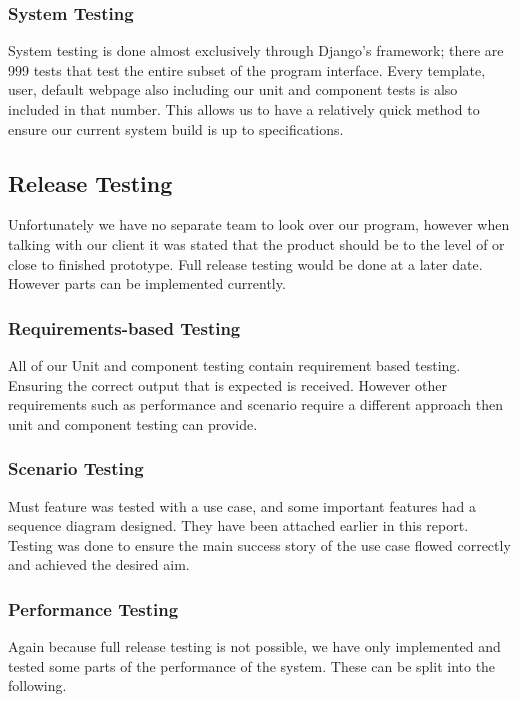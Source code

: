 \documentclass[11pt]{article}
\begin{document}
		\subsubsection{System Testing}

			System testing is done almost exclusively through Django's framework; there are 999 tests that test the entire subset of the program interface. 
			Every template, user, default webpage also including our unit and component tests is also included in that number. 
			This allows us to have a relatively quick method to ensure our current system build is up to specifications.

	\subsection{Release Testing}

		Unfortunately we have no separate team to look over our program, however when talking with our client it was stated that the product should be to the level of or close to finished prototype. 
		Full release testing would be done at a later date. 
		However parts can be implemented currently. 

		\subsubsection{Requirements-based Testing}

			All of our Unit and component testing contain requirement based testing. 
			Ensuring the correct output that is expected is received. 
			However other requirements such as performance and scenario require a different approach then unit and component testing can provide.

		\subsubsection{Scenario Testing}

			Must feature was tested with a use case, and some important features had a sequence diagram designed. 
			They have been attached earlier in this report. 
			Testing was done to ensure the main success story of the use case flowed correctly and achieved the desired aim.

		\subsubsection{Performance Testing}

			Again because full release testing is not possible, we have only implemented and tested some parts of the performance of the system. 
			These can be split into the following.
\end{document}
